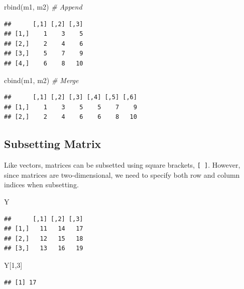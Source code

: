 \documentclass[
]{book}
\newenvironment{Shaded}{\begin{snugshade}}{\end{snugshade}}
\newcommand{\CommentTok}[1]{\textcolor[rgb]{0.56,0.35,0.01}{\textit{#1}}}
\newcommand{\DecValTok}[1]{\textcolor[rgb]{0.00,0.00,0.81}{#1}}
\newcommand{\FunctionTok}[1]{\textcolor[rgb]{0.00,0.00,0.00}{#1}}
\newcommand{\NormalTok}[1]{#1}
\begin{document}
\begin{Shaded}
\begin{Highlighting}[]
\FunctionTok{rbind}\NormalTok{(m1, m2) }\CommentTok{\# Append}
\end{Highlighting}
\end{Shaded}

\begin{verbatim}
##      [,1] [,2] [,3]
## [1,]    1    3    5
## [2,]    2    4    6
## [3,]    5    7    9
## [4,]    6    8   10
\end{verbatim}

\begin{Shaded}
\begin{Highlighting}[]
\FunctionTok{cbind}\NormalTok{(m1, m2) }\CommentTok{\# Merge}
\end{Highlighting}
\end{Shaded}

\begin{verbatim}
##      [,1] [,2] [,3] [,4] [,5] [,6]
## [1,]    1    3    5    5    7    9
## [2,]    2    4    6    6    8   10
\end{verbatim}

\hypertarget{subsetting-matrix}{%
\subsection{Subsetting Matrix}\label{subsetting-matrix}}

Like vectors, matrices can be subsetted using square brackets, \texttt{{[}\ {]}}. However, since matrices are two-dimensional, we need to specify both row and column indices when subsetting.

\begin{Shaded}
\begin{Highlighting}[]
\NormalTok{Y}
\end{Highlighting}
\end{Shaded}

\begin{verbatim}
##      [,1] [,2] [,3]
## [1,]   11   14   17
## [2,]   12   15   18
## [3,]   13   16   19
\end{verbatim}

\begin{Shaded}
\begin{Highlighting}[]
\NormalTok{Y[}\DecValTok{1}\NormalTok{,}\DecValTok{3}\NormalTok{]}
\end{Highlighting}
\end{Shaded}

\begin{verbatim}
## [1] 17
\end{verbatim}
\end{document}
